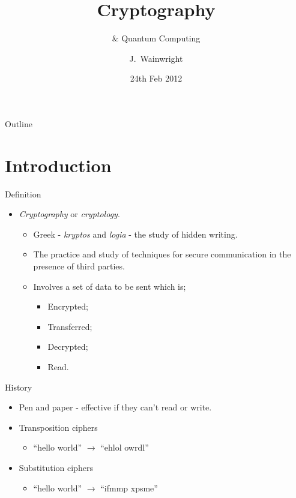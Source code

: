 \documentclass{beamer}
\title[Cryptography] %
{Cryptography}
\subtitle
{\& Quantum Computing} %
\author[Wainwright, Bloggs] %
{J.~Wainwright}
\institute[Universities of Somewhere and Elsewhere] %
{
  Department of Physics and Astronomy\\
  University of Birmingham}
\date[Short Occasion] %
{24th Feb 2012}
\begin{document}
\begin{frame}
  \titlepage
\end{frame}

\begin{frame}{Outline}
  \tableofcontents[pausesections]
\end{frame}

\section{Introduction}

\begin{frame}{Definition}
	\begin{itemize}
		\item \emph{Cryptography} or \emph{cryptology}.
		\begin{itemize}
			\item Greek - \emph{kryptos} and \emph{logia} - the study of hidden writing.
			\item The practice and study of techniques for secure communication in the presence of third parties.
		\end{itemize}
		\begin{itemize}
			\item Involves a set of data to be sent which is;
			\begin{itemize}[<+->]
				\item Encrypted;
				\item Transferred;
				\item Decrypted;
				\item Read.
			\end{itemize}
		\end{itemize}
	\end{itemize}
\end{frame}

\begin{frame}{History}
	\begin{itemize}
		\item Pen and paper - effective if they can't read or write.
		\item Transposition ciphers
		\begin{itemize}
			\item ``hello world'' $\rightarrow$ ``ehlol owrdl''
		\end{itemize}
		\item Substitution ciphers
		\begin{itemize}
			\item ``hello world'' $\rightarrow$ ``ifmmp xpsme''
		\end{itemize}		
		
	\end{itemize}
\end{frame}
\end{document}
